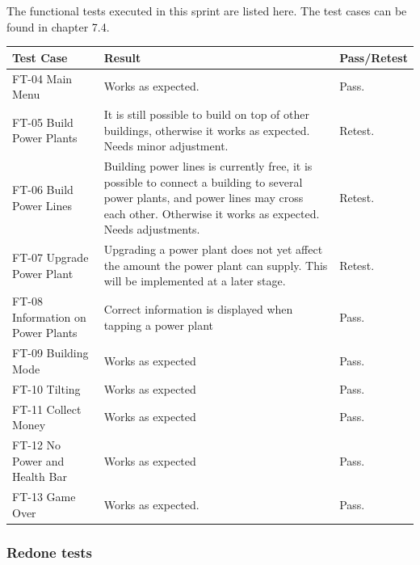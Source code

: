 	The functional tests executed in this sprint are listed here. The test cases can be found in chapter 7.4.


	\begin{tabular}{| p{3cm} | p{7cm} | p{2cm} |}
		\hline
		\rowcolor{lightgray}
		{\bf Test Case} & {\bf Result} & {\bf Pass/Retest} \\ \hline
	  	
	  	FT-04 Main Menu & Works as expected. & Pass. \\ \hline

		FT-05 Build Power Plants & It is still possible to build on top of other buildings, otherwise it works as expected. Needs minor adjustment. &  Retest. \\ \hline

		FT-06 Build Power Lines & Building power lines is currently free, it is possible to connect a building to several power plants, and power lines may cross each other. Otherwise it works as expected. Needs adjustments.  & Retest. \\ \hline

		FT-07 Upgrade Power Plant & Upgrading a power plant does not yet affect the amount the power plant can supply. This will be implemented at a later stage. & Retest. \\ \hline

		FT-08 Information on Power Plants & Correct information is displayed when tapping a power plant & Pass.\\ \hline

		FT-09 Building Mode & Works as expected & Pass. \\ \hline

		FT-10 Tilting & Works as expected & Pass. \\ \hline

		FT-11 Collect Money & Works as expected & Pass. \\ \hline

		FT-12 No Power and Health Bar & Works as expected & Pass. \\ \hline

		FT-13 Game Over & Works as expected. & Pass. \\ \hline

	\end{tabular}

	\subsubsection{Redone tests}

